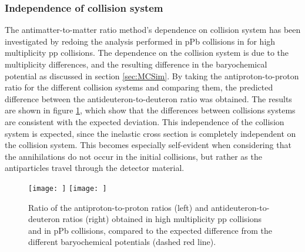 \subsubsection{Independence of collision system}
The antimatter-to-matter ratio method's dependence on collision system has been investigated by redoing the analysis performed in pPb collisions in \cite{dbarIvan} for high multiplicity pp collisions. The dependence on the collision system is due to the multiplicity differences, and the resulting difference in the baryochemical potential as discussed in section \ref{sec:MCSim}. By taking the antiproton-to-proton ratio for the different collision systems and comparing them, the predicted difference between the antideuteron-to-deuteron ratio was obtained. The results are shown in figure \ref{fig:pp_pPb_dbardRatio}, which show that the differences between collisions systems are consistent with the expected deviation. This independence of the collision system is expected, since the inelastic cross section is completely independent on the collision system. This becomes especially self-evident when considering that the annihilations do not occur in the initial collisions, but rather as the antiparticles travel through the detector material.

\begin{figure}[h]
    \centering
    \texttt{[image: ]}
    \texttt{[image: ]}
    \caption{Ratio of the antiproton-to-proton ratios (left) and antideuteron-to-deuteron ratios (right) obtained in high multiplicity pp collisions and in pPb collisions, compared to the expected difference from the different baryochemical potentials (dashed red line).}
    \label{fig:pp_pPb_dbardRatio}
\end{figure}

